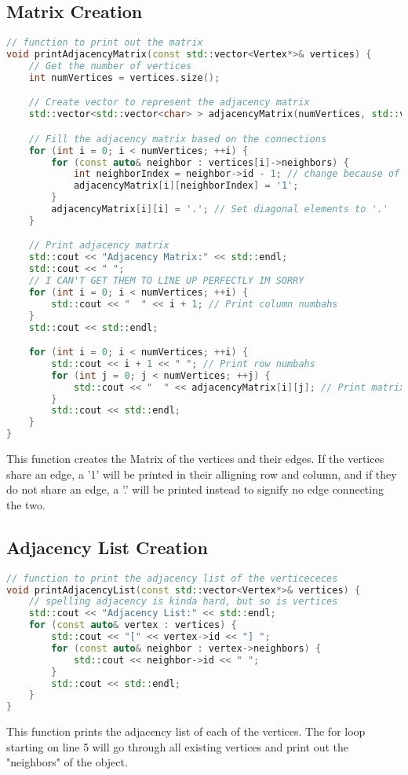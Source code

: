 \documentclass[letterpaper, 10pt,DIV=13]{scrartcl}
\numberwithin{equation}{section} %
\numberwithin{figure}{section} %
\numberwithin{table}{section} %
\begin{document}
\subsection{Matrix Creation}
\begin{lstlisting}[language=c++, caption= Creating a Matrix of Vertices]
// function to print out the matrix
void printAdjacencyMatrix(const std::vector<Vertex*>& vertices) {
    // Get the number of vertices
    int numVertices = vertices.size();

    // Create vector to represent the adjacency matrix
    std::vector<std::vector<char> > adjacencyMatrix(numVertices, std::vector<char>(numVertices, '.'));

    // Fill the adjacency matrix based on the connections
    for (int i = 0; i < numVertices; ++i) {
        for (const auto& neighbor : vertices[i]->neighbors) {
            int neighborIndex = neighbor->id - 1; // change because of zero-based indexing
            adjacencyMatrix[i][neighborIndex] = '1';
        }
        adjacencyMatrix[i][i] = '.'; // Set diagonal elements to '.'
    }

    // Print adjacency matrix
    std::cout << "Adjacency Matrix:" << std::endl;
    std::cout << " ";
    // I CAN'T GET THEM TO LINE UP PERFECTLY IM SORRY
    for (int i = 0; i < numVertices; ++i) {
        std::cout << "  " << i + 1; // Print column numbahs
    }
    std::cout << std::endl;

    for (int i = 0; i < numVertices; ++i) {
        std::cout << i + 1 << " "; // Print row numbahs
        for (int j = 0; j < numVertices; ++j) {
            std::cout << "  " << adjacencyMatrix[i][j]; // Print matrix
        }
        std::cout << std::endl;
    }
}
\end{lstlisting}
This function creates the Matrix of the vertices and their edges. If the vertices share an edge, a '1' will be printed in their alligning row and column, and if they do not share an edge, a '.' will be printed instead to signify no edge connecting the two.
\subsection{Adjacency List Creation}
\begin{lstlisting}[language=c++, caption= Creating an Adjacency List of Vertices]
// function to print the adjacency list of the verticececes
void printAdjacencyList(const std::vector<Vertex*>& vertices) {
    // spelling adjacency is kinda hard, but so is vertices 
    std::cout << "Adjacency List:" << std::endl;
    for (const auto& vertex : vertices) {
        std::cout << "[" << vertex->id << "] ";
        for (const auto& neighbor : vertex->neighbors) {
            std::cout << neighbor->id << " ";
        }
        std::cout << std::endl;
    }
}
\end{lstlisting}
This function prints the adjacency list of each of the vertices. The for loop starting on line 5 will go through all existing vertices and print out the "neighbors" of the object.
\end{document}
